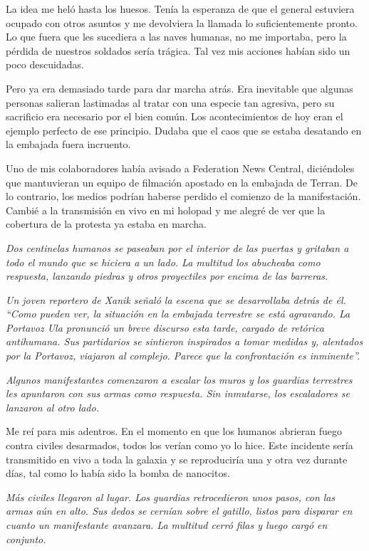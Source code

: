     La idea me heló hasta los huesos. Tenía la esperanza de que el general estuviera ocupado con otros asuntos y me devolviera la llamada lo suficientemente pronto. Lo que fuera que les sucediera a las naves humanas, no me importaba, pero la pérdida de nuestros soldados sería trágica. Tal vez mis acciones habían sido un poco descuidadas.

    Pero ya era demasiado tarde para dar marcha atrás. Era inevitable que algunas personas salieran lastimadas al tratar con una especie tan agresiva, pero su sacrificio era necesario por el bien común. Los acontecimientos de hoy eran el ejemplo perfecto de ese principio. Dudaba que el caos que se estaba desatando en la embajada fuera incruento.

    Uno de mis colaboradores había avisado a Federation News Central, diciéndoles que mantuvieran un equipo de filmación apostado en la embajada de Terran. De lo contrario, los medios podrían haberse perdido el comienzo de la manifestación. Cambié a la transmisión en vivo en mi holopad y me alegré de ver que la cobertura de la protesta ya estaba en marcha.

    \textit{Dos centinelas humanos se paseaban por el interior de las puertas y gritaban a todo el mundo que se hiciera a un lado. La multitud los abucheaba como respuesta, lanzando piedras y otros proyectiles por encima de las barreras.}

    \textit{Un joven reportero de Xanik señaló la escena que se desarrollaba detrás de él. ``Como pueden ver, la situación en la embajada terrestre se está agravando. La Portavoz Ula pronunció un breve discurso esta tarde, cargado de retórica antihumana. Sus partidarios se sintieron inspirados a tomar medidas y, alentados por la Portavoz, viajaron al complejo. Parece que la confrontación es inminente''.}

    \textit{Algunos manifestantes comenzaron a escalar los muros y los guardias terrestres les apuntaron con sus armas como respuesta. Sin inmutarse, los escaladores se lanzaron al otro lado.}

    Me reí para mis adentros. En el momento en que los humanos abrieran fuego contra civiles desarmados, todos los verían como yo lo hice. Este incidente sería transmitido en vivo a toda la galaxia y se reproduciría una y otra vez durante días, tal como lo había sido la bomba de nanocitos.

    \textit{Más civiles llegaron al lugar. Los guardias retrocedieron unos pasos, con las armas aún en alto. Sus dedos se cernían sobre el gatillo, listos para disparar en cuanto un manifestante avanzara. La multitud cerró filas y luego cargó en conjunto.}

